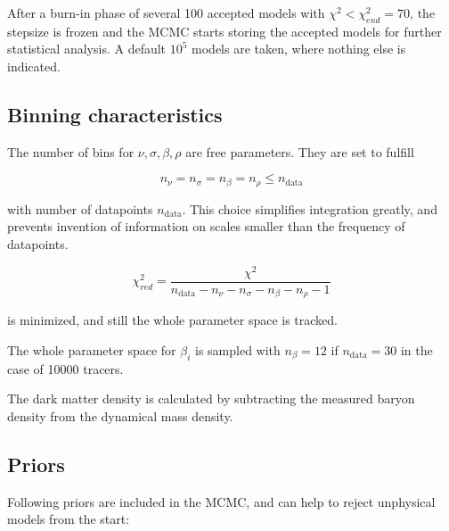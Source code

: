 After a burn-in phase of several 100 accepted models with
$\chi^2<\chi_{end}^2 = 70$, the stepsize is frozen and the MCMC starts
storing the accepted models for further statistical analysis. A
default $10^5$ models are taken, where nothing else is indicated.



\subsection{Binning characteristics}

The number of bins for $\nu, \sigma, \beta, \rho$ are free
parameters. They are set to fulfill

\begin{equation}
n_\nu = n_\sigma = n_\beta = n_\rho \leq n_{\text{data}}
\end{equation}

with number of datapoints $n_{\text{data}}$. This choice simplifies
integration greatly, and prevents invention of information on scales
smaller than the frequency of datapoints.


\begin{equation}
\chi^2_{red} = \frac{\chi^2}{n_{\text{data}} - n_\nu - n_\sigma - n_\beta - n_\rho -1}
\end{equation}

is minimized, and still the whole parameter space is tracked.

The whole parameter space for $\beta_i$ is sampled with $n_\beta=12$
if $n_{\text{data}}=30$ in the case of 10000 tracers.

The dark matter density is calculated by subtracting the measured
baryon density from the dynamical mass density.

\subsection{Priors}
Following priors are included in the MCMC, and can help to reject
unphysical models from the start:

